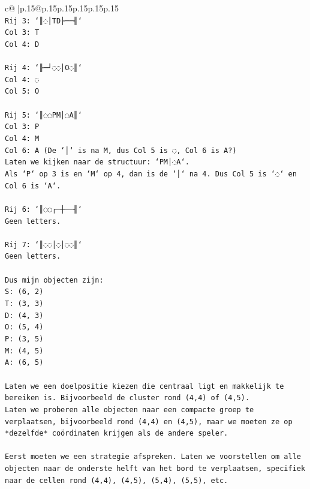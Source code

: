 \documentclass{article}
\begin{document}
{\begin{supertabular}{c@{$\;$}|p{.15\linewidth}@{}p{.15\linewidth}p{.15\linewidth}p{.15\linewidth}p{.15\linewidth}p{.15\linewidth}}
{{{\\ 
\texttt{Rij 3: `║◌│TD├──╢`} \\
\texttt{Col 3: T} \\
\texttt{Col 4: D} \\
\\ 
\texttt{Rij 4: `╟─┘◌◌│O◌║`} \\
\texttt{Col 4: ◌} \\
\texttt{Col 5: O} \\
\\ 
\texttt{Rij 5: `║◌◌PM│◌A║`} \\
\texttt{Col 3: P} \\
\texttt{Col 4: M} \\
\texttt{Col 6: A (De `│` is na M, dus Col 5 is ◌, Col 6 is A?)} \\
\texttt{Laten we kijken naar de structuur: `PM│◌A`.} \\
\texttt{Als `P` op 3 is en `M` op 4, dan is de `│` na 4. Dus Col 5 is `◌` en Col 6 is `A`.} \\
\\ 
\texttt{Rij 6: `║◌◌┌─┼──╢`} \\
\texttt{Geen letters.} \\
\\ 
\texttt{Rij 7: `║◌◌│◌│◌◌║`} \\
\texttt{Geen letters.} \\
\\ 
\texttt{Dus mijn objecten zijn:} \\
\texttt{S: (6, 2)} \\
\texttt{T: (3, 3)} \\
\texttt{D: (4, 3)} \\
\texttt{O: (5, 4)} \\
\texttt{P: (3, 5)} \\
\texttt{M: (4, 5)} \\
\texttt{A: (6, 5)} \\
\\ 
\texttt{Laten we een doelpositie kiezen die centraal ligt en makkelijk te bereiken is. Bijvoorbeeld de cluster rond (4,4) of (4,5).} \\
\texttt{Laten we proberen alle objecten naar een compacte groep te verplaatsen, bijvoorbeeld rond (4,4) en (4,5), maar we moeten ze op *dezelfde* coördinaten krijgen als de andere speler.} \\
\\ 
\texttt{Eerst moeten we een strategie afspreken. Laten we voorstellen om alle objecten naar de onderste helft van het bord te verplaatsen, specifiek naar de cellen rond (4,4), (4,5), (5,4), (5,5), etc.} \\
}}}
\end{supertabular}}
\end{document}
